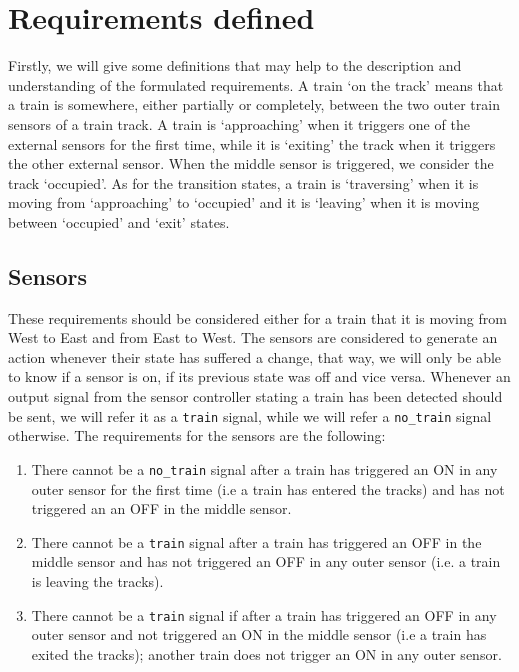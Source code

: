 \documentclass[final]{report}
\begin{document}
\section{Requirements defined}
Firstly, we will give some definitions that may help to the description and understanding of the formulated requirements.
A train `on the track' means that a train is somewhere, either partially or completely, between the two outer train sensors of a train track.
A train is `approaching' when it triggers one of the external sensors for the first time, while it is `exiting' the track when it triggers the other external sensor.
When the middle sensor is triggered, we consider the track `occupied'.
As for the transition states, a train is `traversing' when it is moving from `approaching' to `occupied' and it is `leaving' when it is moving between `occupied' and `exit' states.\\

\subsection{Sensors}
These requirements should be considered either for a train that it is moving from West to East and from East to West.
The sensors are considered to generate an action whenever their state has suffered a change, that way, we will only be able to know if a sensor is on, if its previous state was off and vice versa.
Whenever an output signal from the sensor controller stating a train has been detected should be sent, we will refer it as a \texttt{train} signal, while we will refer a \texttt{no\_train} signal otherwise.
The requirements for the sensors are the following:
	\begin{enumerate}
		\item There cannot be a \texttt{no\_train} signal after a train has triggered an ON in any outer sensor for the first time (i.e a train has entered the tracks) and has not triggered an 
an OFF in the middle sensor.
		\item There cannot be a \texttt{train} signal after a train has triggered an OFF in the middle sensor and has not triggered an OFF in any outer sensor (i.e. a train is leaving the
tracks).
		\item There cannot be a \texttt{train} signal if after a train has triggered an OFF in any outer sensor and not triggered an ON in the middle sensor (i.e a train has exited
 the tracks); another train does not trigger an ON in any outer sensor.		
	\end{enumerate}
\end{document}
